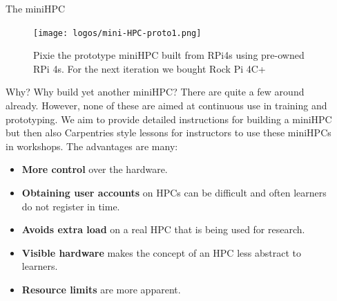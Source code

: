\documentclass[final]{beamer}
\newlength{\sepwidth}
\newlength{\colwidth}
\newcommand{\separatorcolumn}{\begin{column}{\sepwidth}\end{column}}
\begin{document}
\begin{frame}[t]
\begin{columns}[t]
			\separatorcolumn
			
			\begin{column}{\colwidth}
				
				\begin{block}{The miniHPC }

					\begin{figure}
						\begin{center}
							\texttt{[image: logos/mini-HPC-proto1.png]}
							\caption{Pixie the prototype miniHPC built from RPi4s using pre-owned RPi 4s. 
								For the next iteration we bought Rock Pi 4C+}
						\end{center}
					\end{figure}
				\end{block}

				\begin{alertblock}{Why?}
					Why build yet another miniHPC? There are quite a few around already. However, none of these 
					are aimed at continuous use in training and prototyping. We aim to provide detailed instructions
					for building a miniHPC but then also Carpentries style lessons for instructors to use these 
					miniHPCs in workshops. The advantages are many:
					
					\begin{itemize}
						\item \textbf{More control} over the hardware.
						\item \textbf{Obtaining user accounts} on HPCs can be difficult and often
						learners do not register in time.
						\item \textbf{Avoids extra load} on a real HPC that is being used for research.
						\item \textbf{Visible hardware} makes the concept of an HPC less abstract to learners.
						\item \textbf{Resource limits} are more apparent. 
					\end{itemize}
				\end{alertblock}		
					

\end{column}
\end{columns}
\end{frame}
\end{document}
